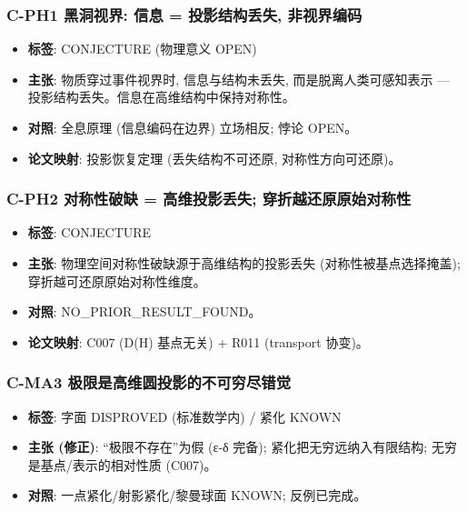 \documentclass[
]{article}
\providecommand{\tightlist}{%
  \setlength{\itemsep}{0pt}\setlength{\parskip}{0pt}}
\begin{document}
\subsubsection{C-PH1 黑洞视界: 信息 = 投影结构丢失,
非视界编码}\label{c-ph1-ux9ed1ux6d1eux89c6ux754c-ux4fe1ux606f-ux6295ux5f71ux7ed3ux6784ux4e22ux5931-ux975eux89c6ux754cux7f16ux7801}

\begin{itemize}
\tightlist
\item
  \textbf{标签}: CONJECTURE (物理意义 OPEN)
\item
  \textbf{主张}: 物质穿过事件视界时, 信息与结构未丢失,
  而是脱离人类可感知表示 --- 投影结构丢失。信息在高维结构中保持对称性。
\item
  \textbf{对照}: 全息原理 (信息编码在边界) 立场相反; 悖论 OPEN。
\item
  \textbf{论文映射}: 投影恢复定理 (丢失结构不可还原, 对称性方向可还原)。
\end{itemize}

\subsubsection{C-PH2 对称性破缺 = 高维投影丢失;
穿折越还原原始对称性}\label{c-ph2-ux5bf9ux79f0ux6027ux7834ux7f3a-ux9ad8ux7ef4ux6295ux5f71ux4e22ux5931-ux7a7fux6298ux8d8aux8fd8ux539fux539fux59cbux5bf9ux79f0ux6027}

\begin{itemize}
\tightlist
\item
  \textbf{标签}: CONJECTURE
\item
  \textbf{主张}: 物理空间对称性破缺源于高维结构的投影丢失
  (对称性被基点选择掩盖); 穿折越可还原原始对称性维度。
\item
  \textbf{对照}: NO\_PRIOR\_RESULT\_FOUND。
\item
  \textbf{论文映射}: C007 (D(H) 基点无关) + R011 (transport 协变)。
\end{itemize}

\subsubsection{C-MA3
极限是高维圆投影的不可穷尽错觉}\label{c-ma3-ux6781ux9650ux662fux9ad8ux7ef4ux5706ux6295ux5f71ux7684ux4e0dux53efux7a77ux5c3dux9519ux89c9}

\begin{itemize}
\tightlist
\item
  \textbf{标签}: 字面 DISPROVED (标准数学内) / 紧化 KNOWN
\item
  \textbf{主张 (修正)}: ``极限不存在''为假 (ε-δ 完备);
  紧化把无穷远纳入有限结构; 无穷是基点/表示的相对性质 (C007)。
\item
  \textbf{对照}: 一点紧化/射影紧化/黎曼球面 KNOWN; 反例已完成。
\end{itemize}
\end{document}
